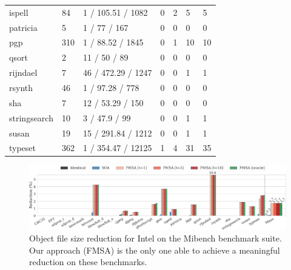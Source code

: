 \begin{table}[h]
{\begin{tabular}{lllllll}
\rowcolor{evencolor} ispell        & 84    & 1 / 105.51 / 1082    & \small 0     & \small 2   & \small 5    & \small 5   \\
                     patricia      & 5     & 1 / 77 / 167         & \small 0     & \small 0   & \small 0    & \small 0   \\
\rowcolor{evencolor} pgp           & 310   & 1 / 88.52 / 1845     & \small 0     & \small 1   & \small 10   & \small 10  \\
                     qsort         & 2     & 11 / 50 / 89         & \small 0     & \small 0   & \small 0    & \small 0   \\
\rowcolor{evencolor} rijndael      & 7     & 46 / 472.29 / 1247   & \small 0     & \small 0   & \small 1    & \small 1   \\
                     rsynth        & 46    & 1 / 97.28 / 778      & \small 0     & \small 0   & \small 0    & \small 0   \\
\rowcolor{evencolor} sha           & 7     & 12 / 53.29 / 150     & \small 0     & \small 0   & \small 0    & \small 0   \\
                     stringsearch  & 10    & 3 / 47.9 / 99        & \small 0     & \small 0   & \small 1    & \small 1   \\
\rowcolor{evencolor} susan         & 19    & 15 / 291.84 / 1212   & \small 0     & \small 0   & \small 1    & \small 1   \\
                     typeset       & 362   & 1 / 354.47 / 12125   & \small 1     & \small 4   & \small 31   & \small 35  \\
\bottomrule
\end{tabular}
}
\label{tab:stats-mibench}
\end{table}


\begin{figure}[t]
  \centering
  \includegraphics[width=\linewidth]{src/merging-optimisation/figs/code-size-reduction-mibench.pdf}
  \caption{Object file size reduction for Intel on the Mibench benchmark suite.
   Our approach (FMSA) is the only one able to achieve a meaningful reduction on these benchmarks.
   }
  \label{fig:code-size-reduction-mibench}
\end{figure}

